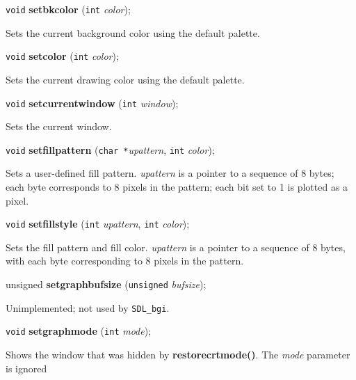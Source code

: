 \documentclass[a4paper,11pt]{article}
\newcommand{\SDLbgi}{\texttt{SDL\_bgi}}
\newcommand{\V}{\texttt{void}}      %
\newcommand{\I}{\texttt{int}}       %
\newcommand{\C}{\texttt{char *}}    %
\newcommand{\func}[1]{\textbf{#1}}  %
\newcommand{\A}[1]{\emph{#1}}       %
\newenvironment{bgi}
{ %
  \begin{snugshade}
}
{ %
  \end{snugshade}
}
\begin{document}

\begin{bgi}
\V{} \func{setbkcolor} (\I{} \A{color});
\end{bgi}

Sets the current background color using the default palette.


\begin{bgi}
\V{} \func{setcolor} (\I{} \A{color});
\end{bgi}

Sets the current drawing color using the default palette.


\begin{bgi}
\V{} \func{setcurrentwindow} (\I{} \A{window});
\end{bgi}

Sets the current window.


\begin{bgi}
\V{} \func{setfillpattern} (\C{}\A{upattern}, \I{} \A{color}); 
\end{bgi}

Sets a user-defined fill pattern. \A{upattern} is a pointer to a
sequence of 8 bytes; each byte corresponds to 8 pixels in the pattern;
each bit set to 1 is plotted as a pixel.


\begin{bgi}
\V{} \func{setfillstyle} (\I{} \A{upattern}, \I{} \A{color}); 
\end{bgi}

Sets the fill pattern and fill color. \A{upattern} is a pointer to a
sequence of 8 bytes, with each byte corresponding to 8 pixels in the
pattern.


\begin{bgi}
unsigned \func{setgraphbufsize} (\texttt{unsigned} \A{bufsize}); 
\end{bgi}

Unimplemented; not used by \SDLbgi.


\begin{bgi}
\V{} \func{setgraphmode} (\I{} \A{mode}); 
\end{bgi}

Shows the window that was hidden by \func{restorecrtmode()}. The
\A{mode} parameter is ignored

\end{document}
